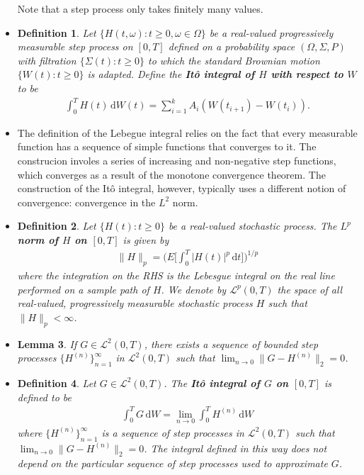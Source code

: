 \documentclass[10pt]{article}
\newtheorem{lemma}{Lemma}
\newtheorem{definition}[lemma]{Definition}
\newcommand{\dee}{\mathrm{d}}
\newcommand{\mcal}[1]{\mathcal{#1}}
\begin{document}
\begin{itemize}
  Note that a step process only takes finitely many values.

  \item \begin{definition}
    Let $\{H(t,\omega): t \geq 0, \omega \in \Omega\}$ be a real-valued progressively measurable step process on $[0,T]$ defined on a probability space $(\Omega,\Sigma,P)$ with filtration $\{ \Sigma(t): t \geq 0 \}$ to which the standard Brownian motion $\{W(t) : t \geq 0\}$ is adapted. Define the {\bf It\^{o} integral of $H$ with respect to $W$} to be
    \begin{align*}
      \int_0^T H(t)\, \dee W(t) = \sum_{i=1}^k A_i ( W(t_{i+1}) - W(t_{i})).
    \end{align*}    
  \end{definition}

  \item The definition of the Lebegue integral relies on the fact that every measurable function has a sequence of simple functions that converges to it. The construcion involes a series of increasing and non-negative step functions, which converges as a result of the monotone convergence theorem. The construction of the It\^{o} integral, however, typically uses a different notion of convergence: convergence in the $L^2$ norm.
  
  \item \begin{definition}
    Let $\{H(t) : t \geq 0\}$ be a real-valued stochastic process. The {\bf $L^p$ norm of $H$ on $[0,T]$} is given by
    \begin{align*}
      \| H \|_p = \bigg( E \bigg[ \int_0^T |H(t)|^p\, \dee t \bigg] \bigg)^{1/p}
    \end{align*}
    where the integration on the RHS is the Lebesgue integral on the real line performed on a sample path of $H$. We denote by $\mcal{L}^p(0,T)$ the space of all real-valued, progressively measurable stochastic process $H$ such that $\| H \|_p < \infty$.    
  \end{definition}

  \item \begin{lemma}
    If $G \in \mcal{L}^2(0,T)$, there exists a sequence of bounded step processes $\{H^{(n)} \}_{n=1}^\infty$ in $\mcal{L}^2(0,T)$ such that
    $\lim_{n \rightarrow 0} \| G - H^{(n)} \|_2 = 0$.    
  \end{lemma}

  \item \begin{definition}
    Let $G \in \mcal{L}^2(0,T)$. The {\bf It\^{o} integral of $G$ on $[0,T]$} is defined to be
    \begin{align*}
      \int_0^T G\, \dee W = \lim_{n \rightarrow 0} \int_0^T H^{(n)}\, \dee W
    \end{align*}
    where $\{H^{(n)} \}_{n=1}^\infty$ is a sequence of step processes in $\mcal{L}^2(0,T)$ such that $\lim_{n \rightarrow 0} \| G - H^{(n)} \|_2 = 0$. The integral defined in this way does not depend on the particular sequence of step processes used to approximate $G$.
  \end{definition}
  

\end{itemize}
\end{document}
